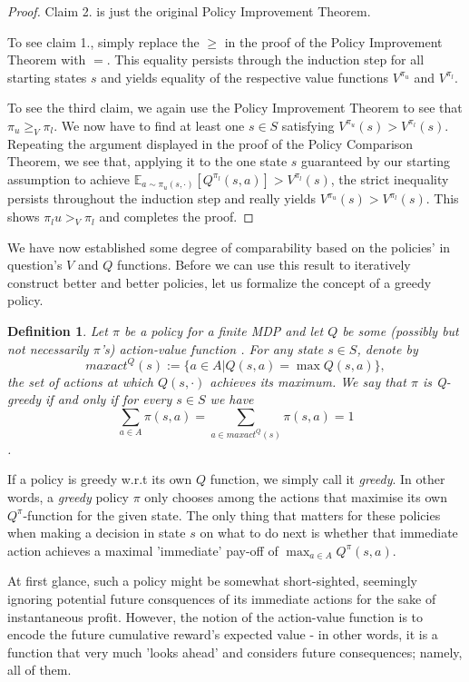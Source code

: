 \documentclass[11pt]{article} %
\newtheorem{defn}{Definition}
\begin{document}
\begin{proof}
	Claim 2. is just the original Policy Improvement Theorem.

To see claim 1., simply replace the $\ge$ in the proof of the Policy Improvement Theorem with $=$. This equality persists through the induction step for all starting states $s$ and yields equality of the respective value functions $V^{\pi_u}$ and $V^{\pi_l}$.

To see the third claim, we again use the Policy Improvement Theorem to see that $\pi_u \ge_V \pi_l$. We now have to find at least one $s \in S$ satisfying $V^{\pi_u}(s) > V^{\pi_l}(s)$. Repeating the argument displayed in the proof of the Policy Comparison Theorem, we see that, applying it to the one state $s$ guaranteed by our starting assumption to achieve $\mathbb{E}_{a \sim \pi_u(s,\cdot )}[Q^{\pi_l}(s,a)] > V^{\pi_l}(s)$, the strict inequality persists throughout the induction step and really yields $V^{\pi_u}(s) > V^{\pi_l}(s)$. This shows $\pi_lu >_V \pi_l$ and completes the proof.
\end{proof}

We have now established some degree of comparability based on the policies' in question's $V$ and $Q$ functions. Before we can use this result to iteratively construct better and better policies, let us formalize the concept of a greedy policy.

\begin{defn}
	Let $\pi$ be a policy for a finite MDP and let $Q$ be some (possibly but not necessarily $\pi$'s) action-value function . For any state $s \in S$, denote by $$maxact^Q(s) := \{a \in A | Q(s,a) = \max Q(s,a)\},$$ the set of actions at which $Q(s,\cdot)$ achieves its maximum. We say that $\pi$ is \textit{Q}\textit{-greedy} if and only if for every $s \in S$ we have $$\sum_{a \in A} \pi(s,a) = \sum_{a \in maxact^Q(s)} \pi(s,a) = 1$$.
\end{defn}

If a policy is greedy w.r.t its own $Q$ function, we simply call it \textit{greedy}. In other words, a \textit{greedy} policy $\pi$ only chooses among the actions that maximise its own $Q^{\pi}$-function for the given state. The only thing that matters for these policies when making a decision in state $s$ on what to do next is whether that immediate action achieves a maximal 'immediate' pay-off of $\max_{a \in A} Q^{\pi}(s,a)$.

At first glance, such a policy might be somewhat short-sighted, seemingly ignoring potential future consquences of its immediate actions for the sake of instantaneous profit. However, the notion of the action-value function is to encode the future cumulative reward's expected value - in other words, it is a function that very much 'looks ahead' and considers future consequences; namely, all of them.
\end{document}
